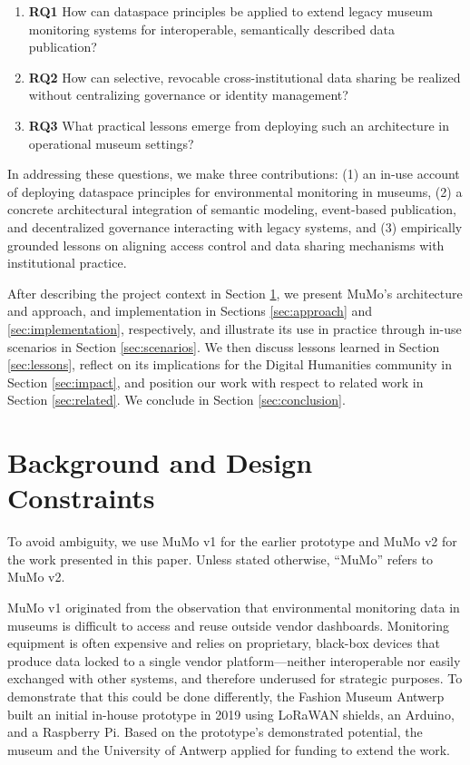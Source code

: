 \documentclass{ceurart}
\providecommand{\tightlist}{%
  \setlength{\itemsep}{0pt}\setlength{\parskip}{0pt}}
\begin{document}
\begin{enumerate}
\def\labelenumi{\arabic{enumi}.}
\tightlist
\item
  \textbf{RQ1} How can dataspace principles be applied to extend legacy
  museum monitoring systems for interoperable, semantically described
  data publication?
\item
  \textbf{RQ2} How can selective, revocable cross-institutional data
  sharing be realized without centralizing governance or identity
  management?
\item
  \textbf{RQ3} What practical lessons emerge from deploying such an
  architecture in operational museum settings?
\end{enumerate}

In addressing these questions, we make three contributions: (1) an
in-use account of deploying dataspace principles for environmental
monitoring in museums, (2) a concrete architectural integration of
semantic modeling, event-based publication, and decentralized governance
interacting with legacy systems, and (3) empirically grounded lessons on
aligning access control and data sharing mechanisms with institutional
practice.

After describing the project context in Section \ref{sec:context}, we
present MuMo's architecture and approach, and implementation in Sections
\ref{sec:approach} and \ref{sec:implementation}, respectively, and
illustrate its use in practice through in-use scenarios in Section
\ref{sec:scenarios}. We then discuss lessons learned in Section
\ref{sec:lessons}, reflect on its implications for the Digital
Humanities community in Section \ref{sec:impact}, and position our work
with respect to related work in Section \ref{sec:related}. We conclude
in Section \ref{sec:conclusion}.

\section{Background and Design Constraints}\label{sec:context}

To avoid ambiguity, we use MuMo v1 for the earlier prototype and MuMo v2
for the work presented in this paper. Unless stated otherwise, ``MuMo''
refers to MuMo v2.

MuMo v1 originated from the observation that environmental monitoring
data in museums is difficult to access and reuse outside vendor
dashboards. Monitoring equipment is often expensive and relies on
proprietary, black-box devices that produce data locked to a single
vendor platform---neither interoperable nor easily exchanged with other
systems, and therefore underused for strategic purposes. To demonstrate
that this could be done differently, the Fashion Museum Antwerp built an
initial in-house prototype in 2019 using LoRaWAN shields, an Arduino,
and a Raspberry Pi. Based on the prototype's demonstrated potential, the
museum and the University of Antwerp applied for funding to extend the
work.
\end{document}
